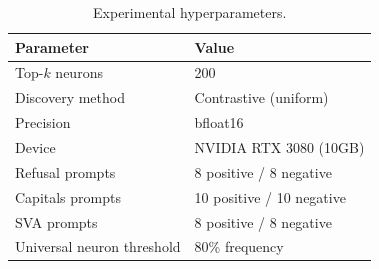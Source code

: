 \documentclass{article}
\begin{document}
\begin{table}[h]
\caption{Experimental hyperparameters.}
\label{tab:hyperparams}
\vskip 0.1in
\begin{center}
\begin{tabular}{ll}
\toprule
\textbf{Parameter} & \textbf{Value} \\
\midrule
Top-$k$ neurons & 200 \\
Discovery method & Contrastive (uniform) \\
Precision & bfloat16 \\
Device & NVIDIA RTX 3080 (10GB) \\
Refusal prompts & 8 positive / 8 negative \\
Capitals prompts & 10 positive / 10 negative \\
SVA prompts & 8 positive / 8 negative \\
Universal neuron threshold & 80\% frequency \\
\bottomrule
\end{tabular}
\end{center}
\end{table}
\end{document}
